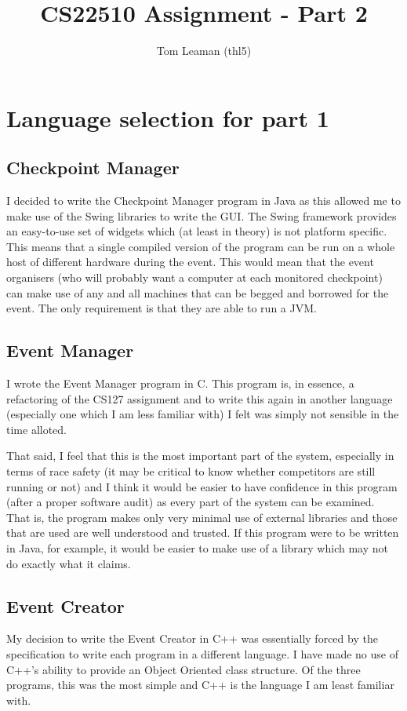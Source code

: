 \documentclass[a4paper, twoside]{article}
\title{CS22510 Assignment - Part 2}
\author{Tom Leaman (thl5)}
\begin{document}
\maketitle
\newpage

\section{Language selection for part 1}
\subsection{Checkpoint Manager}
I decided to write the Checkpoint Manager program in Java as this allowed me to
make use of the Swing libraries to write the GUI. The Swing framework provides
an easy-to-use set of widgets which (at least in theory) is not platform
specific. This means that a single compiled version of the program can be run on
a whole host of different hardware during the event. This would mean that the
event organisers (who will probably want a computer at each monitored
checkpoint) can make use of any and all machines that can be begged and borrowed
for the event. The only requirement is that they are able to run a JVM.

\subsection{Event Manager}
I wrote the Event Manager program in C. This program is, in essence, a
refactoring of the CS127 assignment and to write this again in another language
(especially one which I am less familiar with) I felt was simply not sensible in
the time alloted.

That said, I feel that this is the most important part of the system, especially
in terms of race safety (it may be critical to know whether competitors are
still running or not) and I think it would be easier to have confidence in this
program (after a proper software audit) as every part of the system can be
examined. That is, the program makes only very minimal use of external libraries
and those that are used are well understood and trusted. If this program were to
be written in Java, for example, it would be easier to make use of a library
which may not do exactly what it claims.

\subsection{Event Creator}
My decision to write the Event Creator in C++ was essentially forced by the
specification to write each program in a different language. I have made no use
of C++'s ability to provide an Object Oriented class structure. Of the three
programs, this was the most simple and C++ is the language I am least familiar
with.
\end{document}
